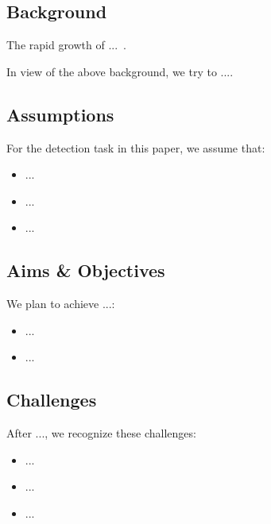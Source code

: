 \subsection{Background}
The rapid growth of ...~\citep{Liu2021}. 

In view of the above background, we try to ....


\subsection{Assumptions}
For the detection task in this paper, we assume that:
\begin{itemize}
    \item ...
    \item ...
    \item ...
\end{itemize}

\subsection{Aims \& Objectives}
We plan to achieve ...:
\begin{itemize}
    \item ...
    \item ...
\end{itemize}

\subsection{Challenges}
After ..., we recognize these challenges:
\begin{itemize}
    \item ...
    \item ...
    \item ...
\end{itemize}

